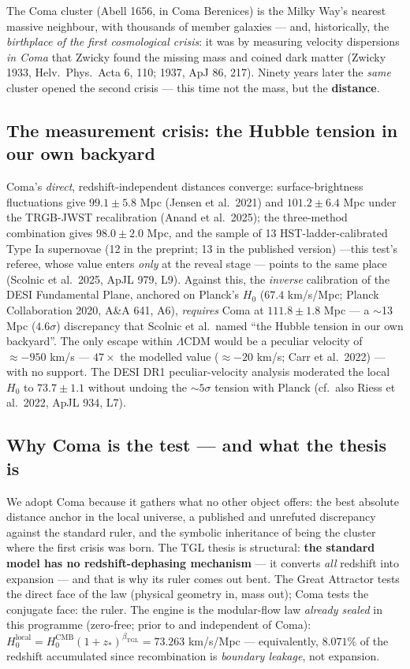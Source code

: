 \documentclass[11pt]{article}
\newcommand{\bTGL}{\beta_{\mathrm{TGL}}}\newcommand{\Msun}{M_{\odot}}\newcommand{\TGL}{\mathrm{TGL}}
\theoremstyle{definition}\newtheorem{deriv}{Derivation}
\begin{document}
The Coma cluster (Abell 1656, in Coma Berenices) is the Milky Way's nearest massive neighbour, with thousands of member galaxies --- and, historically, the \emph{birthplace of the first cosmological crisis}: it was by measuring velocity dispersions \emph{in Coma} that Zwicky found the missing mass and coined dark matter (Zwicky 1933, Helv.\ Phys.\ Acta 6, 110; 1937, ApJ 86, 217). Ninety years later the \emph{same} cluster opened the second crisis --- this time not the mass, but the \textbf{distance}.

\subsection*{The measurement crisis: the Hubble tension in our own backyard}

Coma's \emph{direct}, redshift-independent distances converge: surface-brightness fluctuations give $99.1\pm5.8$ Mpc (Jensen et al.\ 2021) and $101.2\pm6.4$ Mpc under the TRGB-JWST recalibration (Anand et al.\ 2025); the three-method combination gives $98.0\pm2.0$ Mpc, and the sample of 13 HST-ladder-calibrated Type Ia supernovae (12 in the preprint; 13 in the published version) ---this test's referee, whose value enters \emph{only} at the reveal stage --- points to the same place (Scolnic et al.\ 2025, ApJL 979, L9). Against this, the \emph{inverse} calibration of the DESI Fundamental Plane, anchored on Planck's $H_0$ ($67.4$ km/s/Mpc; Planck Collaboration 2020, A\&A 641, A6), \emph{requires} Coma at $111.8\pm1.8$ Mpc --- a $\sim$13 Mpc ($4.6\sigma$) discrepancy that Scolnic et al.\ named ``the Hubble tension in our own backyard''. The only escape within $\Lambda$CDM would be a peculiar velocity of $\approx-950$ km/s --- $47\times$ the modelled value ($\approx-20$ km/s; Carr et al.\ 2022) --- with no support. The DESI DR1 peculiar-velocity analysis moderated the local $H_0$ to $73.7\pm1.1$ without undoing the $\sim5\sigma$ tension with Planck (cf.\ also Riess et al.\ 2022, ApJL 934, L7).

\subsection*{Why Coma is the test --- and what the thesis is}

We adopt Coma because it gathers what no other object offers: the best absolute distance anchor in the local universe, a published and unrefuted discrepancy against the standard ruler, and the symbolic inheritance of being the cluster where the first crisis was born. The TGL thesis is structural: \textbf{the standard model has no redshift-dephasing mechanism} --- it converts \emph{all} redshift into expansion --- and that is why its ruler comes out bent. The Great Attractor tests the direct face of the law (physical geometry in, mass out); Coma tests the conjugate face: the ruler. The engine is the modular-flow law \emph{already sealed} in this programme (zero-free; prior to and independent of Coma): $H_0^{\mathrm{local}}=H_0^{\mathrm{CMB}}(1+z_*)^{\bTGL}=73.263$ km/s/Mpc --- equivalently, $8.071\%$ of the redshift accumulated since recombination is \emph{boundary leakage}, not expansion.
\end{document}
